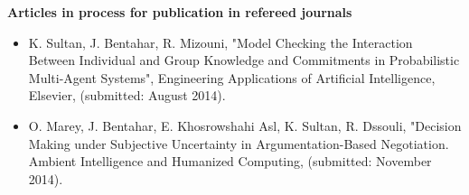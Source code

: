 \textbf{Articles in process for publication in refereed journals}

\begin{itemize}
\item K. Sultan, J. Bentahar, R. Mizouni, "Model Checking the Interaction Between Individual and Group Knowledge and Commitments in Probabilistic Multi-Agent Systems", Engineering Applications of Artificial Intelligence, Elsevier, (submitted: August 2014).
\item O. Marey, J. Bentahar, E. Khosrowshahi Asl, K. Sultan, R. Dssouli, "Decision Making under Subjective Uncertainty in Argumentation-Based Negotiation.  Ambient Intelligence and Humanized Computing, (submitted: November 2014).
\end{itemize}

